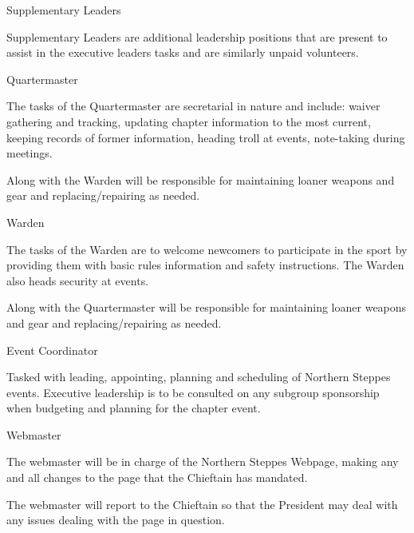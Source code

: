 \documentclass[12pt]{article}
\begin{document}
\begin{level}
    \item Supplementary Leaders
    \begin{level} 
        \item Supplementary Leaders are additional leadership positions that are present to assist in the
    executive leaders tasks and are similarly unpaid volunteers.
        \item {}
        \item Quartermaster
        \begin{level} 
            \item The tasks of the Quartermaster are secretarial in nature and include: waiver gathering and tracking, updating chapter information to the most current, keeping records of former information, heading troll at events, note-taking during meetings.
            \item Along with the Warden will be responsible for maintaining loaner weapons and gear and replacing/repairing as needed.
        \end{level}
        \item Warden
        \begin{level} 
            \item The tasks of the Warden are to welcome newcomers to participate in the sport by providing them with basic rules information and safety instructions. The Warden also heads security at events.
            \item Along with the Quartermaster will be responsible for maintaining loaner weapons and gear and replacing/repairing as needed.
        \end{level}
        \item Event Coordinator
        \begin{level} 
            \item Tasked with leading, appointing, planning and scheduling of Northern Steppes events. Executive leadership is to be consulted on any subgroup sponsorship when budgeting and planning for the chapter event.
        \end{level}
        \item Webmaster
        \begin{level} 
            \item The webmaster will be in charge of the Northern Steppes Webpage, making any and all changes to the page that the Chieftain has mandated.
            \item The webmaster will report to the Chieftain so that the President may deal with any issues dealing with the page in question.

\end{level}
\end{level}
\end{level}
\end{document}
